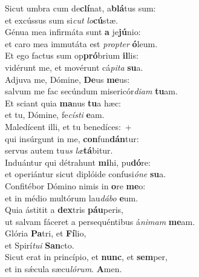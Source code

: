 \evenverse Sicut umbra cum de\textbf{clí}nat, a\textbf{blá}tus sum:~\*\\
\evenverse et excússus sum si\textit{cut} \textit{lo}\textbf{cú}stæ.\\
\oddverse Génua mea infirmáta sunt \textbf{a} je\textbf{jú}nio:~\*\\
\oddverse et caro mea immutáta est \textit{prop}\textit{ter} \textbf{ó}leum.\\
\evenverse Et ego factus sum op\textbf{pró}brium \textbf{il}lis:~\*\\
\evenverse vidérunt me, et movérunt cá\textit{pi}\textit{ta} \textbf{su}a.\\
\oddverse Adjuva me, Dómine, \textbf{De}us \textbf{me}us:~\*\\
\oddverse salvum me fac secúndum misericór\textit{di}\textit{am} \textbf{tu}am.\\
\evenverse Et sciant quia \textbf{ma}nus \textbf{tu}a hæc:~\*\\
\evenverse et tu, Dómine, fe\textit{cí}\textit{sti} \textbf{e}am.\\
\oddverse Maledícent illi, et tu benedíces:~+\\
\oddverse  qui insúrgunt in me, \textbf{con}fun\textbf{dán}tur:~\*\\
\oddverse servus autem tu\textit{us} \textit{læ}\textbf{tá}bitur.\\
\evenverse Induántur qui détrahunt \textbf{mi}hi, pu\textbf{dó}re:~\*\\
\evenverse et operiántur sicut diplóide confusi\textit{ó}\textit{ne} \textbf{su}a.\\
\oddverse Confitébor Dómino nimis in \textbf{o}re \textbf{me}o:~\*\\
\oddverse et in médio multórum lau\textit{dá}\textit{bo} \textbf{e}um.\\
\evenverse Quia ástitit a \textbf{dex}tris \textbf{páu}peris,~\*\\
\evenverse ut salvam fáceret a persequéntibus á\textit{ni}\textit{mam} \textbf{me}am.\\
\oddverse Glória \textbf{Pa}tri, et \textbf{Fí}lio,~\*\\
\oddverse et Spirí\textit{tu}\textit{i} \textbf{San}cto.\\
\evenverse Sicut erat in princípio, et \textbf{nunc}, et \textbf{sem}per,~\*\\
\evenverse et in sǽcula sæcu\textit{ló}\textit{rum}. \textbf{A}men.\\
